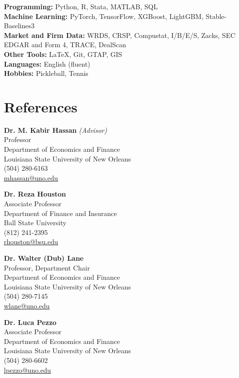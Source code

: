 \documentclass[11pt,letterpaper]{article}
\begin{document}
\textbf{Programming:} Python, R, Stata, MATLAB, SQL\\
\textbf{Machine Learning:} PyTorch, TensorFlow, XGBoost, LightGBM, Stable-Baselines3\\
\textbf{Market and Firm Data:} WRDS, CRSP, Compustat, I/B/E/S, Zacks, SEC EDGAR and Form 4, TRACE, DealScan\\
\textbf{Other Tools:} \LaTeX, Git, GTAP, GIS\\
\textbf{Languages:} English (fluent)\\
\textbf{Hobbies:} Pickleball, Tennis

\section{References}
\vspace{4pt}

\noindent
\begin{minipage}[t]{0.48\textwidth}
\textbf{Dr. M. Kabir Hassan} \textit{(Advisor)}\\[3pt]
Professor\\
Department of Economics and Finance\\
Louisiana State University of New Orleans\\
(504) 280-6163\\
\href{mailto:mhassan@uno.edu}{mhassan@uno.edu}
\end{minipage}
\hfill
\begin{minipage}[t]{0.48\textwidth}
\textbf{Dr. Reza Houston}\\[3pt]
Associate Professor\\
Department of Finance and Insurance\\
Ball State University\\
(812) 241-2395\\
\href{mailto:rhouston@bsu.edu}{rhouston@bsu.edu}
\end{minipage}

\vspace{14pt}

\noindent
\begin{minipage}[t]{0.48\textwidth}
\textbf{Dr. Walter (Dub) Lane}\\[3pt]
Professor, Department Chair\\
Department of Economics and Finance\\
Louisiana State University of New Orleans\\
(504) 280-7145\\
\href{mailto:wlane@uno.edu}{wlane@uno.edu}
\end{minipage}
\hfill
\begin{minipage}[t]{0.48\textwidth}
\textbf{Dr. Luca Pezzo}\\[3pt]
Associate Professor\\
Department of Economics and Finance\\
Louisiana State University of New Orleans\\
(504) 280-6602\\
\href{mailto:lpezzo@uno.edu}{lpezzo@uno.edu}
\end{minipage}
\end{document}
